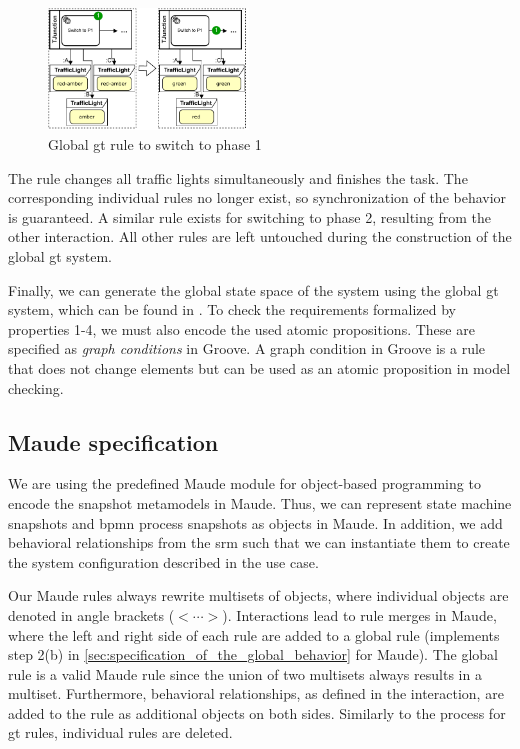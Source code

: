 \documentclass{jot}
\begin{document}
\begin{figure}[h]
    \centering
    \includegraphics[width=0.475\textwidth]{figures/global_rule.pdf}
    \caption{Global \gls*{gt} rule to switch to phase 1}
    \label{fig:global_rule}
\end{figure}

The rule changes all traffic lights simultaneously and finishes the task.
The corresponding individual rules no longer exist, so synchronization of the behavior is guaranteed.
A similar rule exists for switching to phase 2, resulting from the other interaction.
All other rules are left untouched during the construction of the global \gls*{gt} system.

Finally, we can generate the global state space of the system using the global \gls*{gt} system, which can be found in \cite{krauterArtifactsBehavioralConsistency2022}.
To check the requirements formalized by properties 1-4, we must also encode the used atomic propositions.
These are specified as \emph{graph conditions} in Groove.
A graph condition in Groove is a rule that does not change elements but can be used as an atomic proposition in model checking.


\subsection{Maude specification}
We are using the predefined Maude module for object-based programming to encode the snapshot metamodels in Maude.
Thus, we can represent state machine snapshots and \gls*{bpmn} process snapshots as objects in Maude.
In addition, we add behavioral relationships from the \gls*{srm} such that we can instantiate them to create the system configuration described in the use case.

Our Maude rules always rewrite multisets of objects, where individual objects are denoted in angle brackets ($<\cdots>$).
Interactions lead to rule merges in Maude, where the left and right side of each rule are added to a global rule (implements step 2(b) in \cref{sec:specification_of_the_global_behavior} for Maude).
The global rule is a valid Maude rule since the union of two multisets always results in a multiset. 
Furthermore, behavioral relationships, as defined in the interaction, are added to the rule as additional objects on both sides.
Similarly to the process for \gls*{gt} rules, individual rules are deleted.
\end{document}
